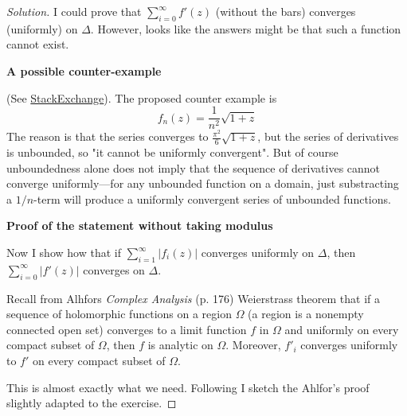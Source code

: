 \begin{proof}[Solution]
	I could prove that $\sum_{i=0}^\infty f'(z)$ (without the bars) converges (uniformly) on $ \Delta$. However, looks like the answers might be that such a function cannot exist.



\vspace{1em}\textbf{A possible counter-example}

(See \href{https://math.stackexchange.com/questions/380446/prove-that-a-bounded-analytic-function-in-the-right-half-plane-which-vanishes-at}{StackExchange}). The proposed counter example is
	\[f_n(z)=\frac{1}{n^2}\sqrt{1+z} \]
	The reason is that the series converges to $\frac{\pi^2}{6}\sqrt{1+z} $, but the series of derivatives is unbounded, so "it cannot be uniformly convergent". But of course unboundedness alone does not imply that the sequence of derivatives cannot converge uniformly---for any unbounded function on a domain, just substracting a $1/n$-term will produce a uniformly convergent series of unbounded functions.
\vspace{1em}

\textbf{Proof of the statement without taking modulus}

Now I show how that if $\sum_{i=1}^{\infty} |f_{i}(z)|$ converges uniformly on $\Delta$, then$\sum_{i=0}^{\infty}|f'(z)|$ converges on $\Delta$.

	Recall from Alhfors \textit{Complex Analysis} (p. 176) Weierstrass theorem that if a sequence of holomorphic functions on a region $\Omega$ (a region is a nonempty connected open set) converges to a limit function $f$ in $\Omega$ and uniformly on every compact subset of $\Omega$, then  $f$ is analytic on $\Omega$. Moreover, $f'_{i}$ converges uniformly to $f'$ on every compact subset of $\Omega$.

	This is almost exactly what we need. Following I sketch the Ahlfor's proof slightly adapted to the exercise.



\end{proof}
